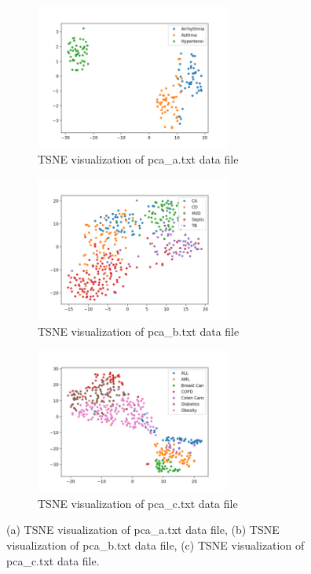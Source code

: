 \documentclass[fleqn]{llncs}
\begin{document}
\begin{figure}
	\centering
	\begin{subfigure}{1.0\textwidth}
		\centering\includegraphics[width=0.7\textwidth]{tsnea.png}
		\caption{TSNE visualization of pca\_a.txt data file}
	\end{subfigure}
	\begin{subfigure}{1.0\textwidth}
		\centering\includegraphics[width=0.7\textwidth]{tsneb.png}
		\caption{TSNE visualization of pca\_b.txt data file}
	\end{subfigure}
	\begin{subfigure}{1.0\textwidth}
		\centering\includegraphics[width=0.7\textwidth]{tsnec.png}
		\caption{TSNE visualization of pca\_c.txt data file}
	\end{subfigure}
	\caption{(a) TSNE visualization of pca\_a.txt data file, (b) TSNE visualization of pca\_b.txt data file, (c) TSNE visualization of pca\_c.txt data file.}
	\label{fig3}
\end{figure}
\end{document}
